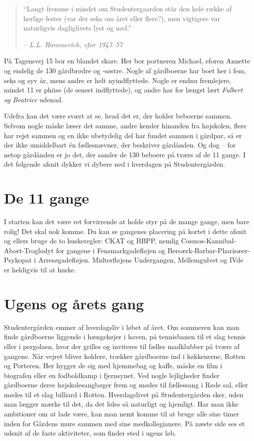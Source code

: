\documentclass[11pt,article,twoside,openany,danish,extrafontsizes]{memoir} %
\begin{document}
\begin{quote} \small
\enquote{Langt fremme i mindet om Studentergaarden står den hele række af herlige fester (var der seks om året eller flere?), men vigtigere var naturligvis dagliglivets lyst og nød.}

\emph{-- L.L. Hammerich, efor 1947--57}
\end{quote}

\noindent
På Tagensvej 15 bor en blandet skare. Her bor portneren Michael, eforen Annette og endelig de 130 gårdbrødre og -søstre. Nogle af gårdboerne har boet her i fem, seks og syv år, mens andre er helt nyindflyttede. Nogle er endnu fremlejere, mindst 11 er phiise (de senest indflyttede), og andre har for længst lært \emph{Fulbert og Beatrice} udenad.

Udefra kan det være svært at se, hvad det er, der holder beboerne sammen. Selvom nogle måske læser det samme, andre kender hinanden fra højskolen, flere har rejst sammen og en ikke ubetydelig del har fundet sammen i gårdpar, så er der ikke umiddelbart én fællesnævner, der beskriver gårdånden. Og dog -- for netop gårdånden er jo det, der samler de 130 beboere på tværs af de 11 gange. I det følgende afsnit dykker vi dybere ned i hverdagen på Studentergården.


\section{De 11 gange}
I starten kan det være ret forvirrende at holde styr på de mange gange, men bare rolig! Det skal nok komme. Du kan se gangenes placering på kortet i dette afsnit og ellers bruge de to huskeregler: CKAT og BBPP, nemlig Cosmos-Kannibal-Abort-Troglodyt for gangene i Fensmarkgadefløjen og Bersærk-Barbar-Pharisæer-Psykopat i Arresøgadefløjen. Midterfløjens Undergangen, Mellemgulvet og IVde er heldigvis til at huske.





\section{Ugens og årets gang}
Studentergården emmer af hverdagsliv i løbet af året. Om sommeren kan man finde gårdboerne liggende i hængekøjer i haven, på tennisbanen til et slag tennis eller i pergolaen, hvor der grilles og inviteres til fælles madklubber på tværs af gangene. Når vejret bliver koldere, trækker gårdboerne ind i køkkenerne, Rotten og Porteren. Her hygger de sig med hjemmebag og kaffe, måske en film i biografen eller en fodboldkamp i fjernsynet. Ved nogle lejligheder finder gårdboerne deres højskolesangbøger frem og mødes til fællessang i Røde sal, eller mødes til et slag billiard i Rotten. Hverdagslivet på Studentergården sker, uden man lægger mærke til det, da det føles så naturligt og hjemligt. Har man ikke ambitioner om at lade være, kan man nemt komme til at bruge alle sine timer inden for Gårdens mure sammen med sine medkollegianere. På næste side ses et udsnit af de faste aktiviteter, som finder sted i ugens løb.
\end{document}

